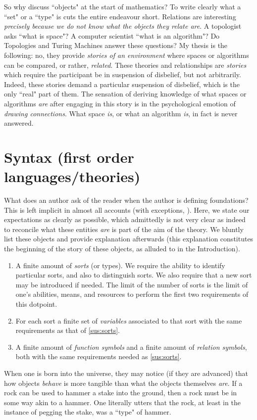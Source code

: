 \documentclass[12pt]{article}
\theoremstyle{plain}
\theoremstyle{definition}
\begin{document}
	So why discuss ``objects" at the start of mathematics? To write clearly what a ``set" or a ``type" is cuts the entire endeavour short. Relations are interesting \emph{precisely because we do not know what the objects they relate are}. A topologist asks ``what is space"? A computer scientist ``what is an algorithm"? Do Topologies and Turing Machines answer these questions? My thesis is the following: no, they provide \emph{stories of an environment} where spaces or algorithms can be compared, or rather, \emph{related}. These theories and relationships are \emph{stories} which require the participant be in suspension of disbelief, but not arbitrarily. Indeed, these stories demand a particular suspension of disbelief, which is the only ``real" part of them. The sensation of deriving knowledge of what spaces or algorithms \emph{are} after engaging in this story is in the psychological emotion of \emph{drawing connections}. What space \emph{is}, or what an algorithm \emph{is}, in fact is never answered.
	\section{Syntax (first order languages/theories)}
	What does an author ask of the reader when the author is defining foundations? This is left implicit in almost all accounts (with exceptions, \cite{Murf_Cat}). Here, we state our expectations as clearly as possible, which admittedly is not very clear as indeed to reconcile what these entities \emph{are} is part of the aim of the theory. We bluntly list these objects and provide explanation afterwards (this explanation constitutes the beginning of the story of these objects, as alluded to in the Introduction).
	\begin{enumerate}
		\item\label{sus:sorts} A finite amount of \emph{sorts} (or types). We require the ability to identify particular sorts, and also to distinguish sorts. We also require that a new sort may be introduced if needed. The limit of the number of sorts is the limit of one's abilities, means, and resources to perform the first two requirements of this dotpoint.
		\item For each sort a finite set of \emph{variables} associated to that sort with the same requirements as that of \ref{sus:sorts}.
		\item A finite amount of \emph{function symbols} and a finite amount of \emph{relation symbols}, both with the same requirements needed as \ref{sus:sorts}.
	\end{enumerate}
	When one is born into the universe, they may notice (if they are advanced) that how objects \emph{behave} is more tangible than what the objects themselves \emph{are}. If a rock can be used to hammer a stake into the ground, then a rock must be in some way akin to a hammer. One literally utters that the rock, at least in the instance of pegging the stake, was a ``type" of hammer.
	
\end{document}
